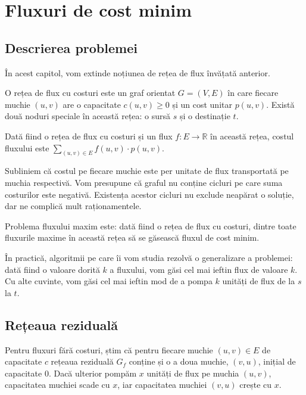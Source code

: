 \documentclass[../main.tex]{subfiles}
\begin{document}
\chapter{Fluxuri de cost minim}

\section{Descrierea problemei}

În acest capitol, vom extinde noțiunea de rețea de flux învățată anterior.

\begin{definition}
  O rețea de flux cu costuri este un graf orientat $G = (V,E)$ în care fiecare muchie $(u,v)$ are o capacitate $c(u, v) \geq 0$ și un cost unitar $p(u,v)$. Există două noduri speciale în această rețea: o sursă $s$ și o destinație $t$.
\end{definition}

\begin{definition}
  Dată fiind o rețea de flux cu costuri și un flux $f: E \to \mathbb{R}$ în această rețea, costul fluxului este $\sum_{(u, v) \in E} f(u, v) \cdot p(u, v)$.
\end{definition}

Subliniem că costul pe fiecare muchie este per unitate de flux transportată pe muchia respectivă. Vom presupune că graful nu conține cicluri pe care suma costurilor este negativă. Existența acestor cicluri nu exclude neapărat o soluție, dar ne complică mult raționamentele.

Problema fluxului maxim este: dată fiind o rețea de flux cu costuri, dintre toate fluxurile maxime în această rețea să se găsească fluxul de cost minim.

În practică, algoritmii pe care îi vom studia rezolvă o generalizare a problemei: dată fiind o valoare dorită $k$ a fluxului, vom găsi cel mai ieftin flux de valoare $k$. Cu alte cuvinte, vom găsi cel mai ieftin mod de a pompa $k$ unități de flux de la $s$ la $t$.


\section{Rețeaua reziduală}

Pentru fluxuri fără costuri, știm că pentru fiecare muchie $(u, v) \in E$ de capacitate $c$ rețeaua reziduală $G_f$ conține și o a doua muchie, $(v, u)$, inițial de capacitate 0. Dacă ulterior pompăm $x$ unități de flux pe muchia $(u,v)$, capacitatea muchiei scade cu $x$, iar capacitatea muchiei $(v,u)$ crește cu $x$.
\end{document}
